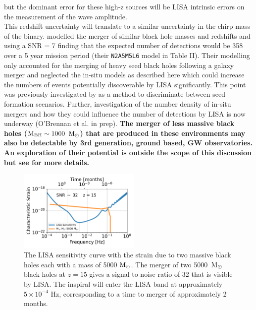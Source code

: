 \documentclass[twocolumn,iop,revtex4]{openjournal}
\newcommand{\msolar} {$\rm{M_{\odot}}~$}
\newcommand{\msolarc} {$\rm{M_{\odot}}$}
\begin{document}
\citep{Shapiro_2010, Petiteau_2011}
but the dominant error for these high-z sources will be LISA intrinsic errors on the measurement of
the wave amplitude. \\
\indent This redshift uncertainty will translate to a similar uncertainty in the chirp mass of the binary.
\cite{Klein_2016} modelled the merger of similar black hole masses and redshifts and using a
SNR = 7 finding that the expected number of detections would be 358 over a 5 year mission period
(their \texttt{N2A5M5L6} model in Table II). Their modelling only accounted for the merging of
heavy seed black holes following a galaxy merger and
neglected the in-situ models as described here which could increase the numbers of events potentially
discoverable by LISA significantly. This point was previously investigated by
\cite{Hartwig_2018} as a method to discriminate between seed formation scenarios. Further,
investigation of the number density of in-situ mergers and how they could influence the number
of detections by LISA is now underway (O'Brennan et al. in prep). \textbf{The merger of less
  massive black holes ($\rm{M_{BH} \sim 1000}$ \msolarc) that are produced in these environments
  may also be detectable by 3rd generation, ground based, GW observatories. An exploration of their
  potential is outside the scope of this discussion but see \cite{Valiante_2020} for more details.}
\begin{figure}
   \centering 
\includegraphics[width=0.525\textwidth]{FIGURES/Sensitivity.pdf}
\caption{The LISA sensitivity curve with the strain due to two massive black holes each with a mass
  of 5000 \msolarc. The merger of two 5000~\msolar black holes at $z = 15$ gives a
  signal to noise ratio of 32 that is visible by LISA. The inspiral will enter the LISA band at
  approximately $5 \times 10^{-4}$ Hz, corresponding to a time to merger of approximately 2 months.}
\label{Fig:Sensitivity}
\end{figure}
\end{document}
